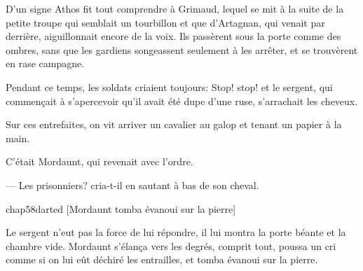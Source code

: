D'un signe Athos fit tout comprendre à Grimaud, lequel se mit à la suite de la petite troupe qui semblait un tourbillon et que d'Artagnan, qui venait par derrière, aiguillonnait encore de la voix. Ils passèrent sous la porte comme des ombres, sans que les gardiens songeassent seulement à les arrêter, et se trouvèrent en rase campagne.

Pendant ce temps, les soldats criaient toujours: Stop! stop! et le sergent, qui commençait à s'apercevoir qu'il avait été dupe d'une ruse, s'arrachait les cheveux.

Sur ces entrefaites, on vit arriver un cavalier au galop et tenant un papier à la main.

C'était Mordaunt, qui revenait avec l'ordre.

— Les prisonniers? cria-t-il en sautant à bas de son cheval.

\begin{bwbigpic}
	[\basicscale] 
	{chap58darted}
	[Mordaunt tomba évanoui sur la pierre]
\end{bwbigpic}

Le sergent n'eut pas la force de lui répondre, il lui montra la porte béante et la chambre vide. Mordaunt s'élança vers les degrés, comprit tout, poussa un cri comme si on lui eût déchiré les entrailles, et tomba évanoui sur la pierre.